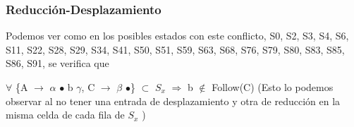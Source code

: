 \documentclass[a4paper, 12pt]{article}
\begin{document}
	\subsubsection*{Reducción-Desplazamiento}
	Podemos ver como en los posibles estados con este conflicto, S0, S2, S3, S4, S6, S11, S22, S28, S29, S34, S41, S50, S51, S59, S63, S68, S76, S79, S80, S83, S85, S86, S91, se verifica que 
	
	$\forall$ \{A $\rightarrow$ $\alpha$ $\bullet$ b $\gamma$, C $\rightarrow$ $\beta$ $\bullet$\} $\subset$ $S_x$ $\Rightarrow$ b $\notin$ Follow(C) (Esto lo podemos observar al no tener una entrada de desplazamiento y otra de reducción en la misma celda de cada fila de $S_x$ )


\begin{table}[htbp]
\centering
 \hspace*{-1.5cm} 
 \begin{turn}{90}
\end{turn}
\end{table}
\end{document}

